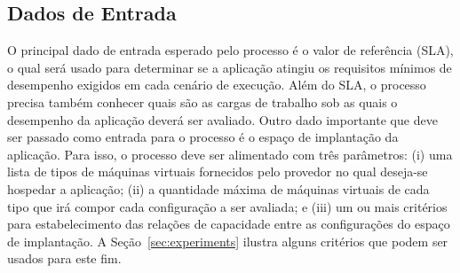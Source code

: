 \documentclass[12pt]{article}
\begin{document}
%
%


\subsection{Dados de Entrada}

O principal dado de entrada esperado pelo processo é o valor de referência (SLA), o qual será usado para determinar 
se a aplicação atingiu os requisitos mínimos de desempenho exigidos em cada cenário de execução. Além do SLA, o processo precisa também conhecer quais são as cargas de trabalho sob as quais o desempenho da aplicação deverá ser avaliado. Outro dado importante que deve ser passado como entrada para o processo é o espaço de implantação da aplicação. Para isso, o processo deve ser alimentado com três parâmetros: (i) uma lista de tipos de máquinas virtuais fornecidos pelo provedor no qual deseja-se hospedar a aplicação; (ii) a quantidade máxima de máquinas virtuais de cada tipo que irá compor cada configuração a ser avaliada; e (iii) um ou mais critérios para estabelecimento das relações de capacidade entre as configurações do espaço de implantação. A Seção~\ref{sec:experiments} ilustra alguns critérios que podem ser usados para este fim. 
\end{document}
